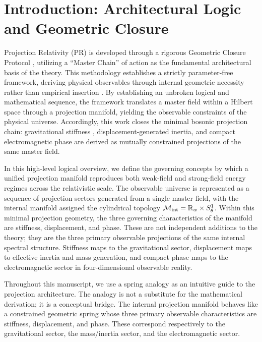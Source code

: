\documentclass[11pt]{article}
\begin{document}
\section{Introduction: Architectural Logic and Geometric Closure}

Projection Relativity (PR) is developed through a rigorous Geometric Closure Protocol \cite{cvitanovic2005}, utilizing a ``Master Chain'' of action as the fundamental architectural basis of the theory. This methodology establishes a strictly parameter-free framework, deriving physical observables through internal geometric necessity rather than empirical insertion \cite{penrose_2016}. By establishing an unbroken logical and mathematical sequence, the framework translates a master field within a Hilbert space \cite{hilbert1912} through a projection manifold, yielding the observable constraints of the physical universe. Accordingly, this work closes the minimal bosonic projection chain: gravitational stiffness \cite{einstein1916}, displacement-generated inertia, and compact electromagnetic phase \cite{maxwell1865} are derived as mutually constrained projections of the same master field.

In this high-level logical overview, we define the governing concepts by which a unified projection manifold reproduces both weak-field and strong-field energy regimes across the relativistic scale. The observable universe is represented as a sequence of projection sectors generated from a single master field, with the internal manifold assigned the cylindrical topology \cite{Kaluza1921} $\mathcal M_{\rm int}=\mathbb R_w\times S^1_\theta$. Within this minimal projection geometry, the three governing characteristics of the manifold are stiffness, displacement, and phase. These are not independent additions to the theory; they are the three primary observable projections of the same internal spectral structure. Stiffness maps to the gravitational sector, displacement maps to effective inertia and mass generation, and compact phase maps to the electromagnetic sector in four-dimensional observable reality.

Throughout this manuscript, we use a spring analogy as an intuitive guide to the projection architecture. The analogy is not a substitute for the mathematical derivation; it is a conceptual bridge. The internal projection manifold behaves like a constrained geometric spring whose three primary observable characteristics are stiffness, displacement, and phase. These correspond respectively to the gravitational sector, the mass/inertia sector, and the electromagnetic sector.
\end{document}
